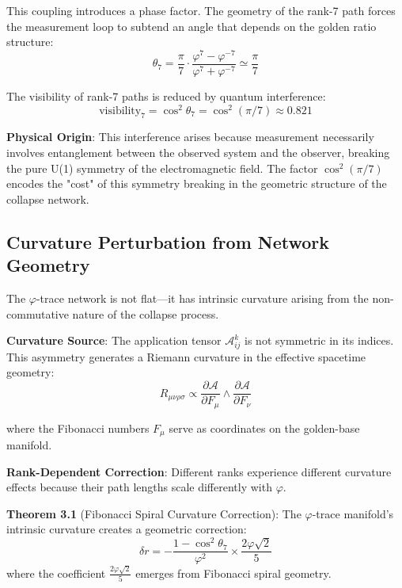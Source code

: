 \documentclass[%
 reprint,
 amsmath,amssymb,
 aps,
 prd,
 nofootinbib,      %
 longbibliography  %
]{revtex4-2}
\begin{document}
This coupling introduces a phase factor. The geometry of the rank-7 path forces the measurement loop to subtend an angle that depends on the golden ratio structure:
\begin{equation}
\theta_7 = \frac{\pi}{7} \cdot \frac{\varphi^7 - \varphi^{-7}}{\varphi^7 + \varphi^{-7}} \simeq \frac{\pi}{7}
\end{equation}

The visibility of rank-7 paths is reduced by quantum interference:
\begin{equation}
\text{visibility}_7 = \cos^2\theta_7 = \cos^2(\pi/7) \approx 0.821
\end{equation}

\textbf{Physical Origin}: This interference arises because measurement necessarily involves entanglement between the observed system and the observer, breaking the pure U(1) symmetry of the electromagnetic field. The factor $\cos^2(\pi/7)$ encodes the "cost" of this symmetry breaking in the geometric structure of the collapse network.

\subsection{Curvature Perturbation from Network Geometry}

The $\varphi$-trace network is not flat—it has intrinsic curvature arising from the non-commutative nature of the collapse process.

\textbf{Curvature Source}: The application tensor $\mathcal{A}_{ij}^k$ is not symmetric in its indices. This asymmetry generates a Riemann curvature in the effective spacetime geometry:
\begin{equation}
R_{\mu\nu\rho\sigma} \propto \frac{\partial \mathcal{A}}{\partial F_\mu} \wedge \frac{\partial \mathcal{A}}{\partial F_\nu}
\end{equation}

where the Fibonacci numbers $F_\mu$ serve as coordinates on the golden-base manifold.

\textbf{Rank-Dependent Correction}: Different ranks experience different curvature effects because their path lengths scale differently with $\varphi$. 

\textbf{Theorem 3.1} (Fibonacci Spiral Curvature Correction): The $\varphi$-trace manifold's intrinsic curvature creates a geometric correction:
\begin{equation}
\delta r = -\frac{1 - \cos^2\theta_7}{\varphi^2} \times \frac{2\varphi\sqrt{2}}{5}
\end{equation}
where the coefficient $\frac{2\varphi\sqrt{2}}{5}$ emerges from Fibonacci spiral geometry.
\end{document}
